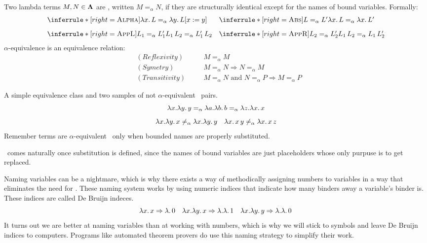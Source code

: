 \begin{definition} Two lambda terms \( M, N \in \mathbf{\Lambda} \) are \aequivlt, written \( M =_\alpha N \), if they are structurally identical except for the names of bound variables.
  Formally:
  \[
    \begin{array}{@{}l@{\quad}l@{}}
      \inferrule*[right=\textsc{Alpha}]
      { }
      { \lam{x}{L} =_\alpha \la y . \, L \subst{x}{y} }
      &
        \inferrule*[right=\textsc{Abs}]
        { L =_\alpha L' }
        { \lam{x}{L} =_\alpha \lam{x}{L'} } \\[2ex]
      \inferrule*[right=\textsc{AppL}]
      { L_1 =_\alpha L_1' }
      { L_1\,L_2 =_\alpha L_1'\,L_2 }
      &
        \inferrule*[right=\textsc{AppR}]
        { L_2 =_\alpha L_2' }
        { L_1\,L_2 =_\alpha L_1\,L_2' }
    \end{array}
  \]
  $\alpha$-equivalence is an equivalence relation:
  \[
    \begin{aligned}
      &(Reflexivity) \quad && M =_\alpha M \\
      &(Symetry) \quad && M =_\alpha N \Rightarrow N =_\alpha M \\ 
      &(Transitivity) \quad && M =_\alpha N \text{ and } N =_\alpha P \Rightarrow M =_\alpha P
    \end{aligned}
  \]
\end{definition}
\begin{example} A simple equivalence class and two samples of not $\alpha$-equivalent \ pairs.
  \[
    \lambda x.\lambda y. \, y =_\alpha \lambda a.\lambda b. \, b =_\alpha \lambda z.\lambda x. \, x
  \]
  \[
    \lambda x. \lambda y. \, x \not=_\alpha \lambda x. \lambda y. \, y \quad \lambda x. \, x \, y \not=_\alpha \lambda x. \, x \, z 
  \]
  Remember terms are $\alpha$-equivalent \ only when bounded names are properly substituted.
\end{example}
\begin{remark}
  \aequiv \ comes naturally once substitution is defined, since the names of bound variables are just placeholders whose only purpuse is to get replaced.
\end{remark}
Naming variables can be a nightmare, which is why there exists a way of methodically assigning numbers to variables in a way that eliminates the need for \aequiv. These naming system works by using numeric indices that indicate how many binders away a variable’s binder is. These indices are called De Bruijn indeces.
\[
  \lambda x.\, x \Rightarrow \lambda.\, 0 \quad \lambda x. \lambda y.\, x \Rightarrow \lambda. \lambda.\, 1 \quad \lambda x. \lambda y.\, y \Rightarrow \lambda. \lambda. \, 0\,
\]
It turns out we are better at naming variables than at working with numbers, which is why we will stick to symbols and leave De Bruijn indices to computers. Programs like automated theorem provers do use this naming strategy to simplify their work.

